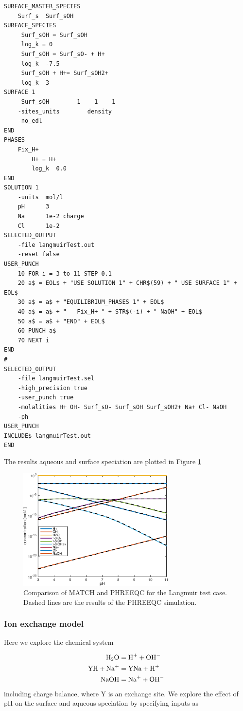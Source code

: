 \documentclass{article}
\begin{document}
\begin{Verbatim}[frame=single,fontsize=\footnotesize]
SURFACE_MASTER_SPECIES
	Surf_s	Surf_sOH
SURFACE_SPECIES
     Surf_sOH = Surf_sOH
     log_k = 0
     Surf_sOH = Surf_sO- + H+
     log_k  -7.5
     Surf_sOH + H+= Surf_sOH2+
     log_k  3
SURFACE 1
     Surf_sOH        1    1    1
	-sites_units		density
	-no_edl
END
PHASES
	Fix_H+
		H+ = H+
		log_k  0.0
END
SOLUTION 1
	-units	mol/l
	pH		3
	Na 		1e-2 charge
	Cl 		1e-2
SELECTED_OUTPUT
    -file langmuirTest.out
    -reset false
USER_PUNCH
	10 FOR i = 3 to 11 STEP 0.1
  	20 a$ = EOL$ + "USE SOLUTION 1" + CHR$(59) + " USE SURFACE 1" + EOL$
	30 a$ = a$ + "EQUILIBRIUM_PHASES 1" + EOL$
	40 a$ = a$ + "   Fix_H+ " + STR$(-i) + " NaOH" + EOL$
	50 a$ = a$ + "END" + EOL$
	60 PUNCH a$
	70 NEXT i
END
#
SELECTED_OUTPUT
	-file langmuirTest.sel
	-high_precision true
	-user_punch true
	-molalities H+ OH- Surf_sO- Surf_sOH Surf_sOH2+ Na+ Cl- NaOH
	-ph
USER_PUNCH
INCLUDE$ langmuirTest.out
END
\end{Verbatim}
The results aqueous and surface speciation are plotted in Figure \ref{fig:langmuir}
\begin{figure}[H]
    \centering
    \includegraphics[width=0.7\textwidth]{langmuirTest.pdf}
    \caption{Comparison of MATCH and PHREEQC for the Langmuir test case. Dashed lines are the results of the PHREEQC simulation.}
    \label{fig:langmuir}
\end{figure}

\subsubsection{Ion exchange model}
Here we explore the chemical system

\begin{align}
    \ce{H2O} &= \ce{H+} + \ce{OH-}\\
    \ce{YH} + \ce{Na+} &=  \ce{YNa} + \ce{H+}\\
    \ce{NaOH} &= \ce{Na+} + \ce{OH-}\\
\end{align}
including charge balance, where Y is an exchange site. We explore the effect of pH on the surface and aqueous speciation by specifying inputs as
\end{document}

